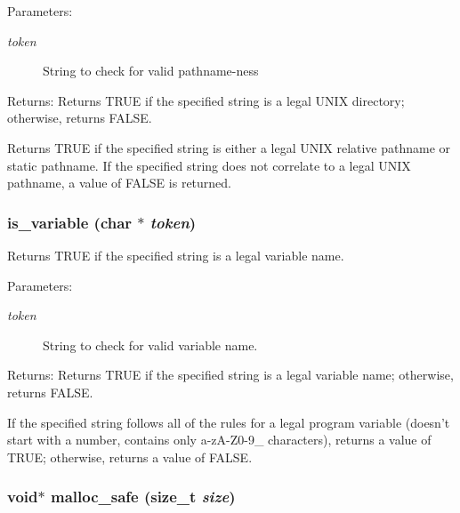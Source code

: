 \begin{Desc}
\item[Parameters:]
\begin{description}
\item[{\em token}]String to check for valid pathname-ness \end{description}
\end{Desc}
\begin{Desc}
\item[Returns:]Returns TRUE if the specified string is a legal UNIX directory; otherwise, returns FALSE.\end{Desc}
Returns TRUE if the specified string is either a legal UNIX relative pathname or static pathname. If the specified string does not correlate to a legal UNIX pathname, a value of FALSE is returned. 
\subsubsection{ is\_\-variable (char $\ast$ {\em token})}\label{util_8h_a3}


Returns TRUE if the specified string is a legal variable name.

\begin{Desc}
\item[Parameters:]
\begin{description}
\item[{\em token}]String to check for valid variable name. \end{description}
\end{Desc}
\begin{Desc}
\item[Returns:]Returns TRUE if the specified string is a legal variable name; otherwise, returns FALSE.\end{Desc}
If the specified string follows all of the rules for a legal program variable (doesn't start with a number, contains only a-z\-A-Z0-9\_\- characters), returns a value of TRUE; otherwise, returns a value of FALSE. 
\subsubsection{\setlength{\rightskip}{0pt plus 5cm}void$\ast$ malloc\_\-safe (size\_\-t {\em size})}\label{util_8h_a13}



